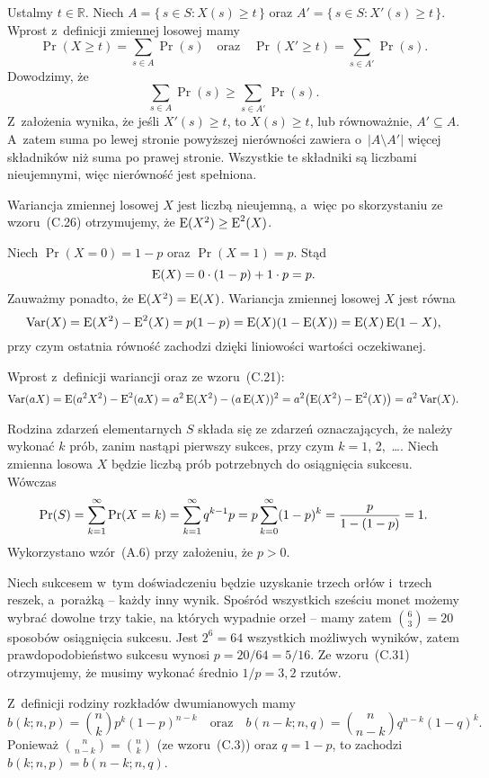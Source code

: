 \exercise %
Ustalmy $t\in\mathbb{R}$. Niech $A=\{\,s\in S:X(s)\ge t\,\}$ oraz $A'=\{\,s\in S:X'(s)\ge t\,\}$. Wprost z~definicji zmiennej losowej mamy
\[
	\Pr(X\ge t) = \sum_{s\in A}\Pr(s) \quad\text{oraz}\quad \Pr(X'\ge t) = \sum_{s\in A'}\Pr(s).
\]
Dowodzimy, że
\[
	\sum_{s\in A}\Pr(s) \ge \sum_{s\in A'}\Pr(s).
\]
Z~założenia wynika, że jeśli $X'(s)\ge t$, to $X(s)\ge t$, lub równoważnie, $A'\subseteq A$. A~zatem suma po lewej stronie powyższej nierówności zawiera o~$|A\setminus A'|$ więcej składników niż suma po prawej stronie. Wszystkie te składniki są liczbami nieujemnymi, więc nierówność jest spełniona.

\exercise %
Wariancja zmiennej losowej $X$ jest liczbą nieujemną, a~więc po skorzystaniu ze wzoru~(C.26) otrzymujemy, że $\operatorname{E}(X^2)\ge\operatorname{E}^2(X)$.

\exercise %
Niech $\Pr(X=0)=1-p$ oraz $\Pr(X=1)=p$. Stąd
\[
    \operatorname{E}(X)=0\cdot(1-p)+1\cdot p=p.
\]
Zauważmy ponadto, że $\operatorname{E}(X^2)=\operatorname{E}(X)$. Wariancja zmiennej losowej $X$ jest równa
\[
	\operatorname{Var}(X) = \operatorname{E}(X^2)-\operatorname{E}^2(X) = p(1-p) = \operatorname{E}(X)(1-\operatorname{E}(X)) = \operatorname{E}(X)\operatorname{E}(1-X),
\]
przy czym ostatnia równość zachodzi dzięki liniowości wartości oczekiwanej.

\exercise %
Wprost z~definicji wariancji oraz ze wzoru~(C.21):
\[
	\operatorname{Var}(aX) = \operatorname{E}(a^2X^2)-\operatorname{E}^2(aX) = a^2\operatorname{E}(X^2)-(a\operatorname{E}(X))^2 = a^2\bigl(\operatorname{E}(X^2)-\operatorname{E}^2(X)\bigr) = a^2\operatorname{Var}(X).
\]


\exercise %
Rodzina zdarzeń elementarnych $S$ składa się ze zdarzeń oznaczających, że należy wykonać $k$ prób, zanim nastąpi pierwszy sukces, przy czym $k=1$, 2,~\dots. Niech zmienna losowa $X$ będzie liczbą prób potrzebnych do osiągnięcia sukcesu. Wówczas
\[
	\Pr(S) = \sum_{k=1}^\infty\Pr(X=k) = \sum_{k=1}^\infty q^{k-1}p = p\sum_{k=0}^\infty(1-p)^k = \frac{p}{1-(1-p)} \\[1mm] = 1.
\]
Wykorzystano wzór~(A.6) przy założeniu, że $p>0$.

\exercise %
Niech sukcesem w~tym doświadczeniu będzie uzyskanie trzech orłów i~trzech reszek, a~porażką -- każdy inny wynik. Spośród wszystkich sześciu monet możemy wybrać dowolne trzy takie, na których wypadnie orzeł -- mamy zatem $\binom{6}{3}=20$ sposobów osiągnięcia sukcesu. Jest $2^6=64$ wszystkich możliwych wyników, zatem prawdopodobieństwo sukcesu wynosi $p=20/64=5/16$. Ze wzoru~(C.31) otrzymujemy, że musimy wykonać średnio $1/p=3{,}2$ rzutów.

\exercise %
Z~definicji rodziny rozkładów dwumianowych mamy
\[
	b(k;n,p) = \binom{n}{k}p^k(1-p)^{n-k} \quad\text{oraz}\quad b(n-k;n,q) = \binom{n}{n-k}q^{n-k}(1-q)^k.
\]
Ponieważ $\binom{n}{n-k}=\binom{n}{k}$ (ze wzoru~(C.3)) oraz $q=1-p$, to zachodzi $b(k;n,p)=b(n-k;n,q)$.


